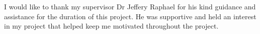 I would like to thank my supervisor Dr Jeffery Raphael for his kind guidance and assistance for the duration of this project. He was supportive and held an interest in my project that helped keep me motivated throughout the project.